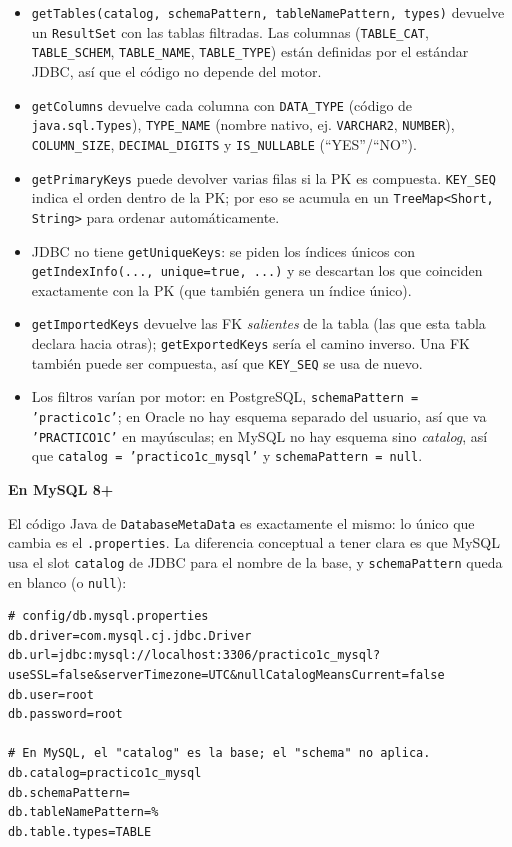 \documentclass[11pt,a4paper]{article}
\newcommand{\itemcabecera}[1]{\noindent\textbf{#1}\par\medskip}
\newcommand{\bloqueMySQL}{\itemcabecera{En MySQL 8+}}
\begin{document}
\begin{itemize}
    \item \texttt{getTables(catalog, schemaPattern, tableNamePattern, types)} devuelve un \texttt{ResultSet} con las tablas filtradas. Las columnas (\texttt{TABLE\_CAT}, \texttt{TABLE\_SCHEM}, \texttt{TABLE\_NAME}, \texttt{TABLE\_TYPE}) están definidas por el estándar JDBC, así que el código no depende del motor.
    \item \texttt{getColumns} devuelve cada columna con \texttt{DATA\_TYPE} (código de \texttt{java.sql.Types}), \texttt{TYPE\_NAME} (nombre nativo, ej. \texttt{VARCHAR2}, \texttt{NUMBER}), \texttt{COLUMN\_SIZE}, \texttt{DECIMAL\_DIGITS} y \texttt{IS\_NULLABLE} (``YES''/``NO'').
    \item \texttt{getPrimaryKeys} puede devolver varias filas si la PK es compuesta. \texttt{KEY\_SEQ} indica el orden dentro de la PK; por eso se acumula en un \texttt{TreeMap<Short, String>} para ordenar automáticamente.
    \item JDBC no tiene \texttt{getUniqueKeys}: se piden los índices únicos con \texttt{getIndexInfo(..., unique=true, ...)} y se descartan los que coinciden exactamente con la PK (que también genera un índice único).
    \item \texttt{getImportedKeys} devuelve las FK \emph{salientes} de la tabla (las que esta tabla declara hacia otras); \texttt{getExportedKeys} sería el camino inverso. Una FK también puede ser compuesta, así que \texttt{KEY\_SEQ} se usa de nuevo.
    \item Los filtros varían por motor: en PostgreSQL, \texttt{schemaPattern = 'practico1c'}; en Oracle no hay esquema separado del usuario, así que va \texttt{'PRACTICO1C'} en mayúsculas; en MySQL no hay esquema sino \emph{catalog}, así que \texttt{catalog = 'practico1c\_mysql'} y \texttt{schemaPattern = null}.
\end{itemize}

\bloqueMySQL

El código Java de \texttt{DatabaseMetaData} es exactamente el mismo: lo único que cambia es el \texttt{.properties}. La diferencia conceptual a tener clara es que MySQL usa el slot \texttt{catalog} de JDBC para el nombre de la base, y \texttt{schemaPattern} queda en blanco (o \texttt{null}):

\begin{lstlisting}[style=propsstyle]
# config/db.mysql.properties
db.driver=com.mysql.cj.jdbc.Driver
db.url=jdbc:mysql://localhost:3306/practico1c_mysql?useSSL=false&serverTimezone=UTC&nullCatalogMeansCurrent=false
db.user=root
db.password=root

# En MySQL, el "catalog" es la base; el "schema" no aplica.
db.catalog=practico1c_mysql
db.schemaPattern=
db.tableNamePattern=%
db.table.types=TABLE
\end{lstlisting}
\end{document}
